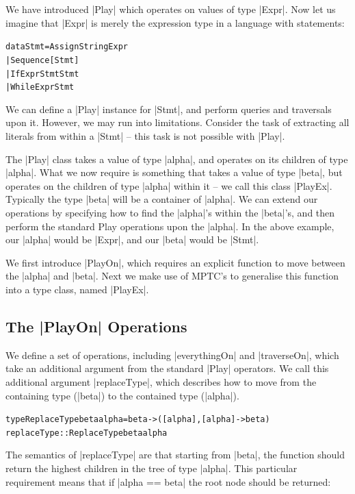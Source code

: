 \documentclass[preprint]{sigplanconf}
\newenvironment{code}{\begin{alltt}\small}{\end{alltt}}
\begin{document}
We have introduced |Play| which operates on values of type |Expr|. Now let us imagine that |Expr| is merely the expression type in a language with statements:

\begin{code}
data Stmt  =  Assign    String  Expr
           |  Sequence  [Stmt]
           |  If        Expr    Stmt Stmt
           |  While     Expr    Stmt
\end{code}

We can define a |Play| instance for |Stmt|, and perform queries and traversals upon it. However, we may run into limitations. Consider the task of extracting all literals from within a |Stmt| -- this task is not possible with |Play|.

The |Play| class takes a value of type |alpha|, and operates on its children of type |alpha|. What we now require is something that takes a value of type |beta|, but operates on the children of type |alpha| within it -- we call this class |PlayEx|. Typically the type |beta| will be a container of |alpha|. We can extend our operations by specifying how to find the |alpha|'s within the |beta|'s, and then perform the standard Play operations upon the |alpha|. In the above example, our |alpha| would be |Expr|, and our |beta| would be |Stmt|.

We first introduce |PlayOn|, which requires an explicit function to move between the |alpha| and |beta|. Next we make use of MPTC's to generalise this function into a type class, named |PlayEx|.

\subsection{The |PlayOn| Operations}

We define a set of operations, including |everythingOn| and |traverseOn|, which take an additional argument from the standard |Play| operators. We call this additional argument |replaceType|, which describes how to move from the containing type (|beta|) to the contained type (|alpha|).

\begin{code}
type ReplaceType beta alpha = beta -> ([alpha], [alpha] -> beta)
replaceType :: ReplaceType beta alpha
\end{code}

The semantics of |replaceType| are that starting from |beta|, the function should return the highest children in the tree of type |alpha|. This particular requirement means that if |alpha == beta| the root node should be returned:
\end{document}
